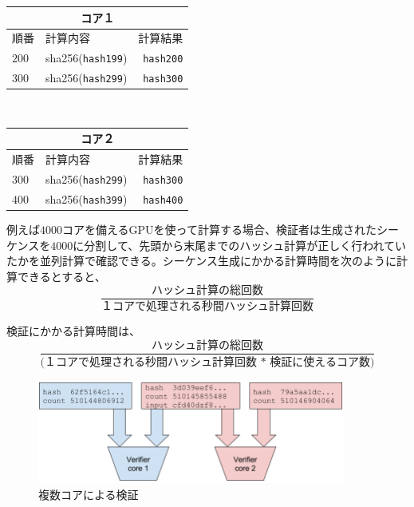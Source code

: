 \documentclass[12pt]{ltjsarticle}
\begin{document}
\begin{center}

\begin{tabular}{l l r}
    \multicolumn{3}{c}{コア１} \\ \hline
    順番  & 計算内容 & 計算結果 \\ \hline
    $200$ & sha256(\texttt{hash199}) & \texttt{hash200} \\ 
    $300$ & sha256(\texttt{hash299}) & \texttt{hash300}\\ 
    \end{tabular}\\
    
  \begin{tabular}{l l r}
    \multicolumn{3}{c}{コア２} \\
    \hline
    順番  & 計算内容 & 計算結果 \\ \hline
    $300$ & sha256(\texttt{hash299}) & \texttt{hash300} \\
    $400$ & sha256(\texttt{hash399}) & \texttt{hash400}\\ 
    \end{tabular}
    
\end{center}


例えば$4000$コアを備えるGPUを使って計算する場合、検証者は生成されたシーケンスを$4000$に分割して、先頭から末尾までのハッシュ計算が正しく行われていたかを並列計算で確認できる。シーケンス生成にかかる計算時間を次のように計算できるとすると、\\


\[
\frac{\textrm{ハッシュ計算の総回数}}{\textrm{１コアで処理される秒間ハッシュ計算回数}}
\]

\noindent 検証にかかる計算時間は、\\

\[
\frac{\textrm{ハッシュ計算の総回数}}{\textrm{(１コアで処理される秒間ハッシュ計算回数 * 検証に使えるコア数)}}
\]

\begin{figure}
  \begin{center}
    \centering
    \includegraphics[width=0.9\textwidth]{figures/fig_4.png}
    \caption[Figure 4]{複数コアによる検証\label{fig:poh_verify}}
  \end{center}
  \end{figure}
\end{document}
